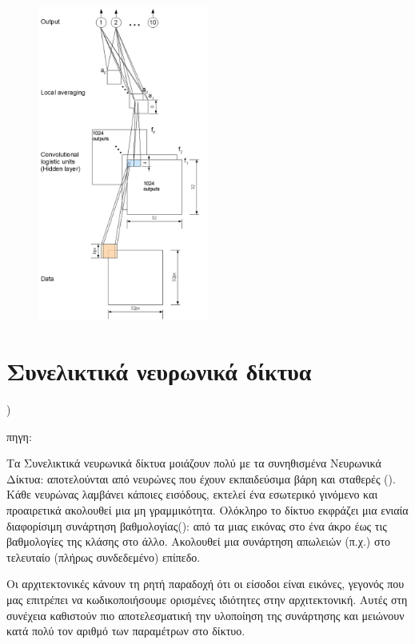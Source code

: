 \begin{figure}[H]
\centering
\includegraphics[width=0.5\textwidth]{images/Ch2/cnn-architecture.png}
\caption{}
\label{fig:cnn architecture}
\end{figure}

\section{Συνελικτικά νευρωνικά δίκτυα}
)

πηγη:

Τα Συνελικτικά νευρωνικά δίκτυα μοιάζουν πολύ με τα συνηθισμένα Νευρωνικά Δίκτυα: αποτελούνται από νευρώνες που έχουν εκπαιδεύσιμα βάρη και σταθερές ().  Κάθε νευρώνας λαμβάνει κάποιες εισόδους, εκτελεί ένα εσωτερικό γινόμενο και προαιρετικά ακολουθεί μια μη γραμμικότητα. Ολόκληρο το δίκτυο εκφράζει μια ενιαία διαφορίσιμη συνάρτηση βαθμολογίας(): από τα  μιας εικόνας στο ένα άκρο έως τις βαθμολογίες της κλάσης στο άλλο. Ακολουθεί μια συνάρτηση απωλειών (π.χ.) στο τελευταίο (πλήρως συνδεδεμένο) επίπεδο.

Οι αρχιτεκτονικές  κάνουν τη ρητή παραδοχή ότι οι είσοδοι είναι εικόνες, γεγονός που μας επιτρέπει να κωδικοποιήσουμε ορισμένες ιδιότητες στην αρχιτεκτονική. Αυτές στη συνέχεια καθιστούν πιο αποτελεσματική την υλοποίηση της συνάρτησης  και μειώνουν κατά πολύ τον αριθμό των παραμέτρων στο δίκτυο.

